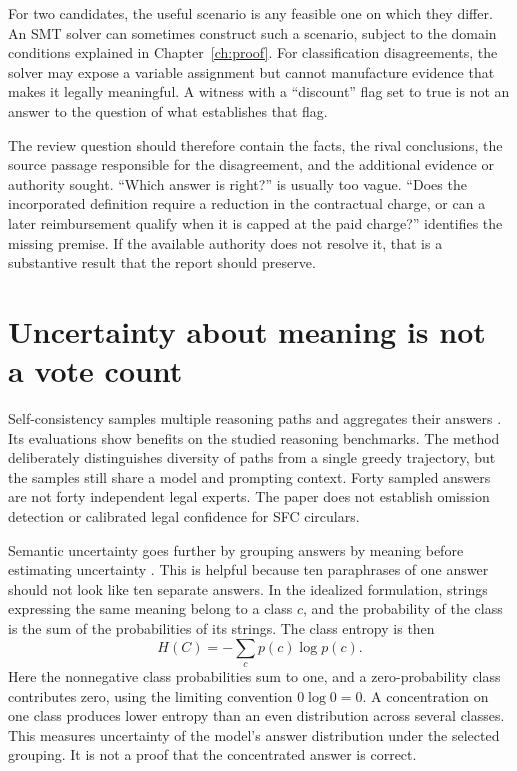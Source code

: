 \documentclass[12pt,a4paper,oneside,openany]{book}
\begin{document}
For two candidates, the useful scenario is any feasible one on which they differ.
An SMT solver can sometimes construct such a scenario, subject to the domain
conditions explained in Chapter~\ref{ch:proof}. For classification disagreements,
the solver may expose a variable assignment but cannot manufacture evidence that
makes it legally meaningful. A witness with a ``discount'' flag set to true is not
an answer to the question of what establishes that flag.

The review question should therefore contain the facts, the rival conclusions,
the source passage responsible for the disagreement, and the additional evidence
or authority sought. ``Which answer is right?'' is usually too vague. ``Does the
incorporated definition require a reduction in the contractual charge, or can a
later reimbursement qualify when it is capped at the paid charge?'' identifies
the missing premise. If the available authority does not resolve it, that is a
substantive result that the report should preserve.

\section{Uncertainty about meaning is not a vote count}
\label{merge:M05:09}


Self-consistency samples multiple reasoning paths and aggregates their answers
\citep[section 2]{selfconsistency2023}. Its evaluations show benefits on the
studied reasoning benchmarks. The method deliberately distinguishes diversity of
paths from a single greedy trajectory, but the samples still share a model and
prompting context. Forty sampled answers are not forty independent legal experts.
The paper does not establish omission detection or calibrated legal confidence
for SFC circulars.

Semantic uncertainty goes further by grouping answers by meaning before
estimating uncertainty \citep[sections 3--4]{semantic2023}. This is helpful because
ten paraphrases of one answer should not look like ten separate answers. In the
idealized formulation, strings expressing the same meaning belong to a class
$c$, and the probability of the class is the sum of the probabilities of its
strings. The class entropy is then
\begin{equation}
 H(C)=-\sum_c p(c)\log p(c).
 \label{eq:semantic-entropy}
\end{equation}
Here the nonnegative class probabilities sum to one, and a zero-probability
class contributes zero, using the limiting convention $0\log 0=0$.
A concentration on one class produces lower entropy than an even distribution
across several classes. This measures uncertainty of the model's answer
distribution under the selected grouping. It is not a proof that the concentrated
answer is correct.
\end{document}
